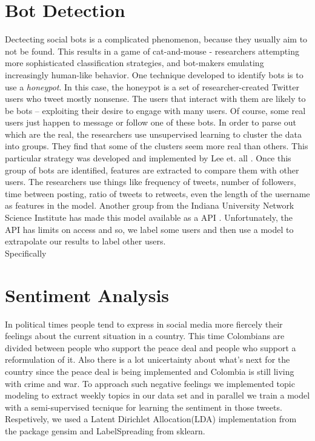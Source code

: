 \documentclass[10pt,a4paper]{article} %
\begin{document}
	\section{Bot Detection} 
		Dectecting social bots is a complicated phenomenon, because they usually aim to not be found.  This results in a game of cat-and-mouse - researchers attempting more sophisticated classification strategies, and bot-makers emulating increasingly human-like behavior.  One technique developed to identify bots is to use a \textit{honeypot}.  In this case, the honeypot is a set of researcher-created Twitter users who tweet mostly nonsense.  The users that interact with them are likely to be bots -- exploiting their desire to engage with many users.  Of course, some real users just happen to message or follow one of these bots.  In order to parse out which are the real, the researchers use unsupervised learning to cluster the data into groups.  They find that some of the clusters seem more real than others.  This particular strategy was developed and implemented by Lee et. all \cite{}.  Once this group of bots are identified, features are extracted to compare them with other users.  The researchers use things like frequency of tweets, number of followers, time between posting, ratio of tweets to retweets, even the length of the username as features in the model.  Another group from the Indiana University Network Science Institute has made this model available as a API \cite{DavisVFFM16}.  Unfortunately, the API has limits on access and so, we label some users and then use a model to extrapolate our results to label other users. \\
		
		\noindent Specifically
	\section{Sentiment Analysis}
In political times people tend to express in social media more fiercely their feelings about the current situation in a country. This time Colombians are divided between people who support the peace deal and people who support a reformulation of it. Also there is a lot unicertainty about what's next for the country since the peace deal is being implemented and Colombia is still living with crime and war. To approach such negative feelings we implemented topic modeling to extract weekly topics in our data set and in parallel we train a model with a semi-supervised tecnique for learning the sentiment in those tweets. Respetively, we used a Latent Dirichlet Allocation(LDA) implementation from the package gensim and LabelSpreading from sklearn.
	
\end{document}
